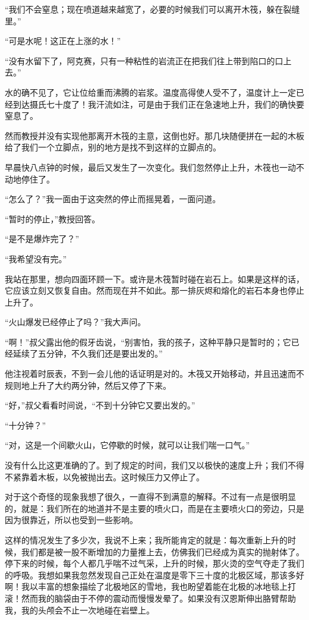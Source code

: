 \documentclass[10pt]{book}
\begin{document}
“我们不会窒息；现在喷道越来越宽了，必要的时候我们可以离开木筏，躲在裂缝里。”

“可是水呢！这正在上涨的水！”

“没有水留下了，阿克赛，只有一种粘性的岩流正在把我们往上带到陷口的口上去。”

水的确不见了，它让位给重而沸腾的岩浆。温度高得使人受不了，温度计上一定已经到达摄氏七十度了！我汗流如注，可是由于我们正在急速地上升，我们的确快要窒息了。

然而教授并没有实现他那离开木筏的主意，这倒也好。那几块随便拼在一起的木板给了我们一个立脚点，别的地方是找不到这样的立脚点的。

早晨快八点钟的时候，最后又发生了一次变化。我们忽然停止上升，木筏也一动不动地停住了。

“怎么了？”我一面由于这突然的停止而摇晃着，一面问道。

“暂时的停止，”教授回答。

“是不是爆炸完了？”

“我希望没有完。”

我站在那里，想向四面环顾一下。或许是木筏暂时碰在岩石上。如果是这样的话，它应该立刻又恢复自由。然而现在并不如此。那一排灰烬和熔化的岩石本身也停止上升了。

“火山爆发已经停止了吗？”我大声问。

“啊！”叔父露出他的假牙齿说，“别害怕，我的孩子，这种平静只是暂时的；它已经延续了五分钟，不久我们还是要出发的。”

他注视着时辰表，不到一会儿他的话证明是对的。木筏又开始移动，并且迅速而不规则地上升了大约两分钟，然后又停了下来。

“好，”叔父看看时间说，“不到十分钟它又要出发的。”

“十分钟？”

“对，这是一个间歇火山，它停歇的时候，就可以让我们喘一口气。”

没有什么比这更准确的了。到了规定的时间，我们又以极快的速度上升；我们不得不紧靠着木板，以免被抛出去。这时候压力又停止了。

对于这个奇怪的现象我想了很久，一直得不到满意的解释。不过有一点是很明显的，就是：我们所在的地道并不是主要的喷火口，而是在主要喷火口的旁边，只是因为很靠近，所以也受到一些影响。

这样的情况发生了多少次，我说不上来；我所能肯定的就是：每次重新上升的时候，我们都是被一股不断增加的力量推上去，仿佛我们已经成为真实的抛射体了。停下来的时候，每个人都几乎喘不过气采，上升的时候，那火烫的空气夺走了我们的呼吸。我想如果我忽然发现自己正处在温度是零下三十度的北极区域，那该多好啊！我以丰富的想象描绘了北极地区的雪地，我也盼望着能在北极的冰地毯上打滚！然而我的脑袋由于不停的震动而慢慢发晕了。如果没有汉恩斯伸出胳臂帮助我，我的头颅会不止一次地碰在岩壁上。
\end{document}

